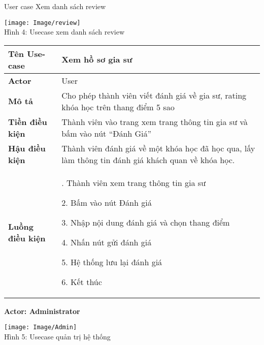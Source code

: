 \documentclass[12pt,a4paper]{report}
\begin{document}
 \newpage
 User case Xem danh sách review
 
 \begin{center}
    \begin{center}
     \texttt{[image: Image/review]}\\
     Hình 4: Usecase xem danh sách review
    \end{center}
\end{center}

\begin{center}
 \begin{tabular}{|>{\raggedright\arraybackslash}m{4cm}|>{\raggedright\arraybackslash}m{11.5cm}|}
 \hline 
 \textbf{Tên Use-case} & Xem hồ sơ gia sư \\ 
 \hline 
 \textbf{Actor} & User \\ 
 \hline 
\textbf{ Mô tả} & Cho phép thành viên viết đánh giá về gia sư, rating
khóa học trên thang điểm 5 sao \\ 
 \hline 
 \textbf{Tiền điều kiện} & Thành viên vào trang xem trang thông tin gia sư và bấm
vào nút “Đánh Giá”\\ 
 \hline 
 \textbf{Hậu điều kiện} & Thành viên đánh giá về một khóa học đã học qua, lấy làm thông tin đánh giá khách quan về khóa học. \\ 
 \hline 
 \textbf{Luồng điều kiện} & 1. Thành viên xem trang thông tin gia sư
 
				   2. Bấm vào nút Đánh giá

			       3. Nhập nội dung đánh giá và chọn thang điểm
			       
			       4. Nhấn nút gửi đánh giá
			       
			       5. Hệ thống lưu lại đánh giá
			       
			       6. Kết thúc\\ 
 \hline  
 \end{tabular} 
 \end{center}
 
 \newpage
 \textbf{Actor: Administrator}
 
 \begin{center}
    \begin{center}
     \texttt{[image: Image/Admin]}\\
     Hình 5: Usecase quản trị hệ thống
    \end{center}
\end{center}
\end{document}
